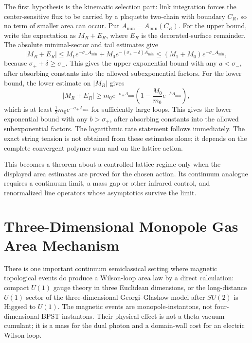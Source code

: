 \begin{controlledapproximation}
The first hypothesis is the kinematic selection part: link integration forces
the center-sensitive flux to be carried by a plaquette two-chain with boundary
\(C_R\), so no term of smaller area can occur.  Put
\(A_{\min}=A_{\min}(C_R)\).  For the upper bound, write the expectation as
\(M_R+E_R\), where \(E_R\) is the decorated-surface remainder.
The absolute minimal-sector and tail estimates give
\[
  |M_R+E_R|
  \le
  M_1e^{-\sigma_-A_{\min}}
  +
  M_0e^{-(\sigma_++\delta)A_{\min}}
  \le
  (M_1+M_0)e^{-\sigma_-A_{\min}},
\]
because \(\sigma_++\delta\ge\sigma_-\).  This gives the upper exponential
bound with any \(a<\sigma_-\), after absorbing constants into the allowed
subexponential factors.  For the lower bound, the lower estimate on
\(|M_R|\) gives
\[
  |M_R+E_R|
  \ge
  m_0e^{-\sigma_+A_{\min}}
  \left(1-\frac{M_0}{m_0}e^{-\delta A_{\min}}\right),
\]
which is at least \(\frac12m_0e^{-\sigma_+A_{\min}}\) for sufficiently large
loops.  This gives the lower exponential bound with any \(b>\sigma_+\), after
absorbing constants into the allowed subexponential factors.  The logarithmic
rate statement follows immediately.  The exact string tension is not obtained
from these estimates alone; it depends on the complete convergent polymer
sum and on the lattice action.
\end{controlledapproximation}

This becomes a theorem about a controlled lattice regime only when the
displayed area estimates are proved for the chosen action.  Its continuum
analogue requires a continuum limit, a mass gap or other infrared control,
and renormalized line operators whose asymptotics survive the limit.

\section{Three-Dimensional Monopole Gas Area Mechanism}

There is one important continuum semiclassical setting where magnetic
topological events do produce a Wilson-loop area law by a direct calculation:
compact \(U(1)\) gauge theory in three Euclidean dimensions, or the
long-distance \(U(1)\) sector of the three-dimensional Georgi--Glashow model
after \(SU(2)\) is Higgsed to \(U(1)\).  The magnetic events are
monopole-instantons, not four-dimensional BPST instantons.  Their physical
effect is not a theta-vacuum cumulant; it is a mass for the dual photon and a
domain-wall cost for an electric Wilson loop.

